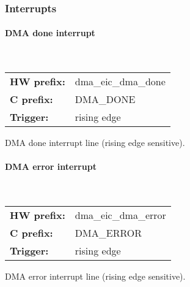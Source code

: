 \subsubsection{Interrupts}
\paragraph*{DMA done interrupt}\mbox{}\\\vskip 6pt
\begin{small}
\begin{tabular}{l l }
{\bf HW prefix:}  & dma\_eic\_dma\_done\\
{\bf C prefix:}  & DMA\_DONE\\
{\bf Trigger:}  & rising edge\\
\end{tabular}

\end{small}
\vspace{12pt}
DMA done interrupt line (rising edge sensitive).
\paragraph*{DMA error interrupt}\mbox{}\\\vskip 6pt
\begin{small}
\begin{tabular}{l l }
{\bf HW prefix:}  & dma\_eic\_dma\_error\\
{\bf C prefix:}  & DMA\_ERROR\\
{\bf Trigger:}  & rising edge\\
\end{tabular}

\end{small}
\vspace{12pt}
DMA error interrupt line (rising edge sensitive).

